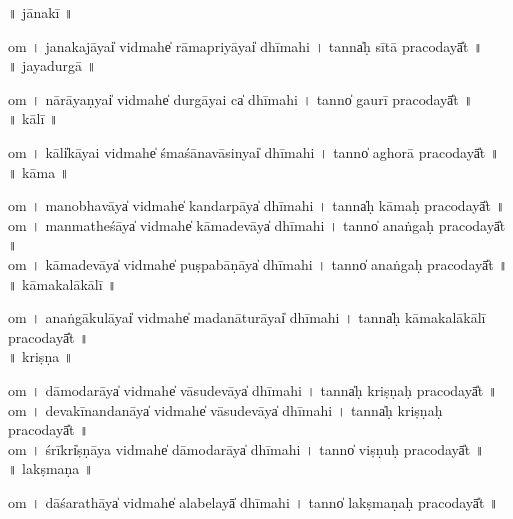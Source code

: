 \documentclass[parskip, DIV=14]{scrartcl}
\begin{document}
\vspace{0.201cm} ॥   jānakī  ॥ \par
  om  । ja॒na॒ka॒jāyai̍ vi॒dmahe̍ rāmapri॒yāyai̍  dhīmahi  ।   tanna̍ḥ sītā praco॒dayā̎t ॥ \\

\vspace{0.201cm} ॥   jayadurgā  ॥ \par
  om  । nā॒rā॒yaṇyai̍ vi॒dmahe̍ durgā॒yai ca̍  dhīmahi  ।   tanno̍ gaurī praco॒dayā̎t ॥ \\

\vspace{0.201cm} ॥   kālī  ॥ \par
  om  । kāli̍kāyai vi॒dmahe̍ śmaśānavā॒sinyai̍ dhīmahi  ।  tanno̍ aghorā praco॒dayā̎t ॥ \\

\vspace{0.201cm} ॥   kāma  ॥ \par
  om  । ma॒no॒bha॒vāya̍ vi॒dmahe̍ kanda॒rpāya̍ dhīmahi  ।  tanna̍ḥ kāmaḥ praco॒dayā̎t ॥ \\
  om  । ma॒nma॒the॒śāya̍ vi॒dmahe̍ kāmade॒vāya̍ dhīmahi  ।  tanno̍ anaṅgaḥ praco॒dayā̎t ॥ \\
  om  । kā॒ma॒de॒vāya̍ vi॒dmahe̍ puṣpabā॒ṇāya̍ dhīmahi  ।   tanno̍ anaṅgaḥ praco॒dayā̎t ॥ \\

\vspace{0.201cm} ॥   kāmakalākālī  ॥ \par
  om  । a॒na॒ṅgā॒ku॒lāyai̍ vi॒dmahe̍ madanātu॒rāyai̍ dhīmahi  ।  tanna̍ḥ kāmakalākālī praco॒dayā̎t ॥ \\

\vspace{0.201cm} ॥   kriṣṇa  ॥ \par
  om  । dā॒mo॒da॒rāya̍ vi॒dmahe̍ vāsude॒vāya̍  dhīmahi  ।   tanna̍ḥ kriṣṇaḥ praco॒dayā̎t ॥ \\
  om  । de॒va॒kī॒na॒nda॒nāya̍ vi॒dmahe̍ vāsude॒vāya̍  dhīmahi  ।   tanna̍ḥ kriṣṇaḥ praco॒dayā̎t ॥ \\
  om  । śrīkri̍ṣṇāya vi॒dmahe̍ dāmoda॒rāya̍  dhīmahi  ।   tanno̍ viṣṇuḥ praco॒dayā̎t ॥ \\

\vspace{0.201cm} ॥   lakṣmaṇa  ॥ \par
  om  । dā॒śa॒ra॒thāya̍ vi॒dmahe̍ alabe॒layā̍ dhīmahi  ।  tanno̍ lakṣmaṇaḥ praco॒dayā̎t ॥ \\
\end{document}
